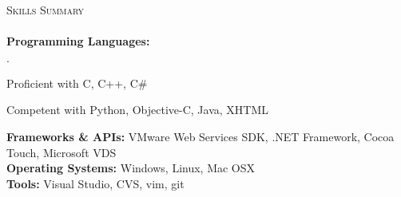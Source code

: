 \documentclass[11pt]{article}
\newcommand{\mydot}{$\cdot$ }
\newcommand{\lineunder}{\vspace*{-8pt} \\ \hspace*{-18pt} \hrulefill \\}
\newcommand{\header}[1]{{\hspace*{-15pt}\vspace*{6pt} \textsc{#1}} \vspace*{-6pt} \lineunder}
\newenvironment{achievements}{\begin{list}{\mydot}{\topsep 0pt \itemsep -2pt}}{\vspace*{4pt}\end{list}}
\begin{document}

\header{Skills Summary}
\textbf{Programming Languages:} 
\begin{achievements}
  \item Proficient with C, C++, C\#
  \item Competent with Python, Objective-C, Java, XHTML
\end{achievements}
\vspace{-3pt}

\textbf{Frameworks \& APIs:} VMware Web Services SDK, .NET Framework, Cocoa Touch, Microsoft VDS\\

\textbf{Operating Systems:} Windows, Linux, Mac OSX\\

\textbf{Tools:} Visual Studio, CVS, vim, git\\
\end{document}
